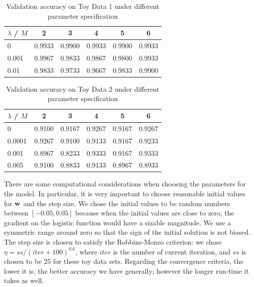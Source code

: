 \begin{table}[h!]
\centering
\caption{Validation accuracy on Toy Data 1 under different parameter specification}\label{tab:toy_1_cv}
\begin{tabular}{ lccccc }
\hline\hline
$\lambda$ / $M$ 		& 2 		& 3			&4			&5		&6\\
\hline
0 				& 0.9933    & 0.9900    & 0.9933   &  0.9900  &   0.9933\\
0.001 			& 0.9967    & 0.9833    & 0.9867    & 0.9800   &  0.9933\\
0.01				& 0.9833    & 0.9733    & 0.9667    & 0.9833   & 0.9900\\
\hline\hline
\end{tabular}
\end{table}
         
         
\begin{table}[h!]
\centering
\caption{Validation accuracy on Toy Data 2 under different parameter specification}\label{tab:toy_2_cv}
\begin{tabular}{ lccccc }
\hline\hline
$\lambda$ / $M$ 		& 2 		& 3			&4			&5		&6\\
\hline         
0        & 0.9100    & 0.9167    & 0.9267    & 0.9167    & 0.9267\\
0.0001   & 0.9267  	& 0.9100 	& 0.9133   &  0.9167   & 0.9233\\
0.001    & 0.8967    & 0.8233    & 0.9333    & 0.9167    & 0.9333\\
0.005	& 0.9100    &  0.8833    & 0.9133   & 0.8967    & 0.8933\\
\hline\hline
\end{tabular}
\end{table}


There are some computational considerations when choosing the parameters for the model. In particular, it is very important to choose reasonable initial values for $\boldsymbol{\mathbf{w}}$ and the step size. We chose the initial values to be random numbers between $[-0.05, 0.05]$ because when the initial values are close to zero, the gradient on the logistic function would have a sizable magnitude. We use a symmetric range around zero so that the sign of the initial solution is not biased.  The step size is chosen to satisfy the Robbins-Monro criterion: we chose $\eta = ss/(iter + 100)^{0.6}$, where $iter$ is the number of current iteration, and $ss$ is chosen to be 25 for these toy data sets. Regarding the convergence criteria, the lower it is, the better accuracy we have generally; however the longer run-time it takes as well.

